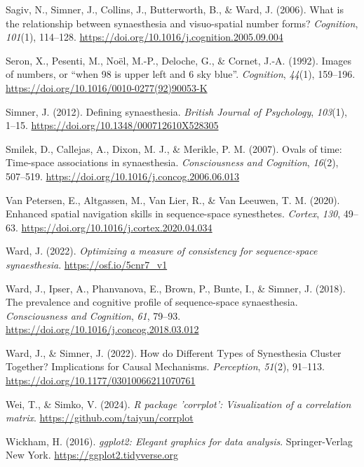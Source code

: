 \documentclass[
  man,
  longtable,
  a4paper,
  nolmodern,
  notxfonts,
  notimes,
  colorlinks=true,linkcolor=blue,citecolor=blue,urlcolor=blue]{apa7}
\newlength{\cslhangindent}
\newenvironment{CSLReferences}[2] %
 {\begin{list}{}{%
  \setlength{\itemindent}{0pt}
  \setlength{\leftmargin}{0pt}
  \setlength{\parsep}{0pt}
  \ifodd #1
   \setlength{\leftmargin}{\cslhangindent}
   \setlength{\itemindent}{-1\cslhangindent}
  \fi
  \setlength{\itemsep}{#2\baselineskip}}}
 {\end{list}}
\begin{document}
\begin{CSLReferences}{1}{0}
Sagiv, N., Simner, J., Collins, J., Butterworth, B., \& Ward, J. (2006).
What is the relationship between synaesthesia and visuo-spatial number
forms? \emph{Cognition}, \emph{101}(1), 114--128.
\url{https://doi.org/10.1016/j.cognition.2005.09.004}

Seron, X., Pesenti, M., Noël, M.-P., Deloche, G., \& Cornet, J.-A.
(1992). Images of numbers, or {``}when 98 is upper left and 6 sky
blue{''}. \emph{Cognition}, \emph{44}(1), 159--196.
\url{https://doi.org/10.1016/0010-0277(92)90053-K}

Simner, J. (2012). Defining synaesthesia. \emph{British Journal of
Psychology}, \emph{103}(1), 1--15.
\url{https://doi.org/10.1348/000712610X528305}

Smilek, D., Callejas, A., Dixon, M. J., \& Merikle, P. M. (2007). Ovals
of time: Time-space associations in synaesthesia. \emph{Consciousness
and Cognition}, \emph{16}(2), 507--519.
\url{https://doi.org/10.1016/j.concog.2006.06.013}

Van Petersen, E., Altgassen, M., Van Lier, R., \& Van Leeuwen, T. M.
(2020). Enhanced spatial navigation skills in sequence-space
synesthetes. \emph{Cortex}, \emph{130}, 49--63.
\url{https://doi.org/10.1016/j.cortex.2020.04.034}

Ward, J. (2022). \emph{Optimizing a measure of consistency for
sequence-space synaesthesia}. \url{https://osf.io/5cnr7_v1}

Ward, J., Ipser, A., Phanvanova, E., Brown, P., Bunte, I., \& Simner, J.
(2018). The prevalence and cognitive profile of sequence-space
synaesthesia. \emph{Consciousness and Cognition}, \emph{61}, 79--93.
\url{https://doi.org/10.1016/j.concog.2018.03.012}

Ward, J., \& Simner, J. (2022). How do Different Types of Synesthesia
Cluster Together? Implications for Causal Mechanisms. \emph{Perception},
\emph{51}(2), 91--113. \url{https://doi.org/10.1177/03010066211070761}

Wei, T., \& Simko, V. (2024). \emph{R package '{corrplot}':
Visualization of a correlation matrix}.
\url{https://github.com/taiyun/corrplot}

Wickham, H. (2016). \emph{{ggplot2}: Elegant graphics for data
analysis}. Springer-Verlag New York. \url{https://ggplot2.tidyverse.org}


\end{CSLReferences}
\end{document}
